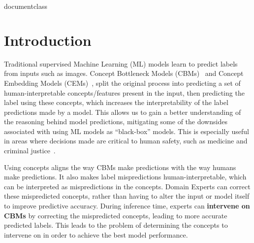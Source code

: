 \csname documentclass

\chapter{Introduction}
\label{firstcontentpage}


Traditional supervised Machine Learning (ML) models learn to 
predict labels from inputs such as images.
Concept Bottleneck Models (CBMs)~\cite{cbm} and Concept Embedding Models (CEMs)~\cite{cem},
split the original process into predicting a set of human-interpretable
concepts/features present in the input, then predicting the label using these concepts,
which increases the interpretability of the label predictions 
made by a model.
This allows us to 
gain a better understanding of the reasoning behind model  
predictions, 
mitigating some of the downsides associated with using ML models as ``black-box'' models.
This is especially useful in areas where 
decisions made are critical to 
human safety, such as medicine
and criminal justice~\cite{xai-1, xai, xai-2}.

Using concepts aligns the way
CBMs make predictions with the way humans make predictions.
It also makes label mispredictions
human-interpretable, which
can be interpreted as mispredictions in
the concepts. Domain Experts can correct these
mispredicted concepts, rather than having to alter the 
input or model itself to improve predictive accuracy.
During inference time, experts can \textbf{intervene on CBMs} by correcting
the mispredicted concepts, leading to more accurate predicted labels. 
This leads to the problem of determining the concepts to intervene on in order
to achieve the best model performance.

